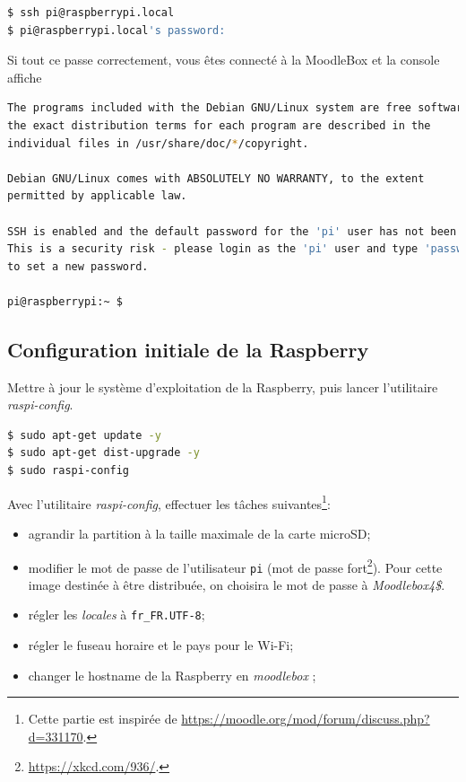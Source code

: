 \documentclass[11pt]{article}
\begin{document}
\begin{lstlisting}[language=bash]
$ ssh pi@raspberrypi.local
$ pi@raspberrypi.local's password:
\end{lstlisting}

\begin{verification}
Si tout ce passe correctement, vous êtes connecté à la MoodleBox et la console affiche

\begin{lstlisting}[language=bash]
The programs included with the Debian GNU/Linux system are free software;
the exact distribution terms for each program are described in the
individual files in /usr/share/doc/*/copyright.

Debian GNU/Linux comes with ABSOLUTELY NO WARRANTY, to the extent
permitted by applicable law.

SSH is enabled and the default password for the 'pi' user has not been changed.
This is a security risk - please login as the 'pi' user and type 'passwd'
to set a new password.

pi@raspberrypi:~ $
\end{lstlisting}
\end{verification}

\subsection{Configuration initiale de la Raspberry}

Mettre à jour le système d'exploitation de la Raspberry, puis lancer l'utilitaire \emph{raspi-config}.

\begin{lstlisting}[language=bash]
$ sudo apt-get update -y
$ sudo apt-get dist-upgrade -y
$ sudo raspi-config
\end{lstlisting}

Avec l'utilitaire \emph{raspi-config}, effectuer les tâches suivantes\footnote{Cette partie est inspirée de \url{https://moodle.org/mod/forum/discuss.php?d=331170}.}:
\begin{itemize}
\item agrandir la partition à la taille maximale de la carte microSD;
\item modifier le mot de passe de l'utilisateur \lstinline{pi} (mot de passe fort\footnote{\url{https://xkcd.com/936/}.}). Pour cette image destinée à être distribuée, on choisira le mot de passe à \emph{Moodlebox4\$}.
\item régler les \emph{locales} à \lstinline{fr_FR.UTF-8};
\item régler le fuseau horaire et le pays pour le Wi-Fi;
\item changer le hostname de la Raspberry en \emph{moodlebox} ;
\end{itemize}
\end{document}
